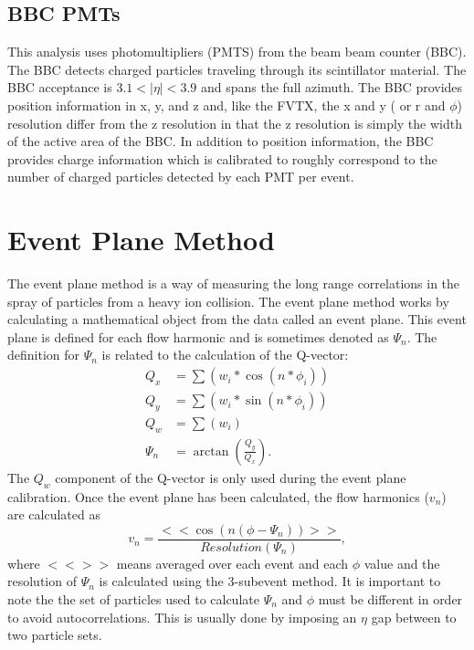 \subsection{BBC PMTs}
This analysis uses photomultipliers (PMTS) from the beam beam counter (BBC). The BBC detects charged particles traveling through its scintillator material. The BBC acceptance is $3.1 < |\eta| < 3.9$ and spans the full azimuth. The BBC provides position information in x, y, and z and, like the FVTX, the x and y ( or r and $\phi$) resolution differ from the z resolution in that the z resolution is simply the width of the active area of the BBC. In addition to position information, the BBC provides charge information which is calibrated to roughly correspond to the number of charged particles detected by each PMT per event.
\section{Event Plane Method}
The event plane method is a way of measuring the long range correlations in the spray of particles from a heavy ion collision. The event plane method works by calculating a mathematical object
from the data called an event plane. This event plane is defined for each flow harmonic and is sometimes denoted as $\Psi_n$. The definition for $\Psi_n$ is related to the calculation of the Q-vector:
\begin{align}
Q_x &= \sum( w_i * \cos(n * \phi_i)) \\
Q_y &= \sum( w_i * \sin(n * \phi_i)) \\
Q_w &= \sum( w_i ) \\
\Psi_n &= \arctan( \frac{Q_y}{Q_x} ).
\end{align}
The $Q_w$ component of the Q-vector is only used during the event plane calibration.
Once the event plane has been calculated, the flow harmonics ($v_n$) are calculated as
\begin{equation}
v_n = \frac{<<\cos(n(\phi - \Psi_n))>>}{Resolution(\Psi_n)},
\end{equation}
where $<<>>$ means averaged over each event and each $\phi$ value and the resolution of $\Psi_n$ is calculated using the 3-subevent method. It is important to note the the set of particles used to calculate $\Psi_n$ and $\phi$ must be different in order to avoid
autocorrelations. This is usually done by imposing an $\eta$ gap between to two particle sets.

